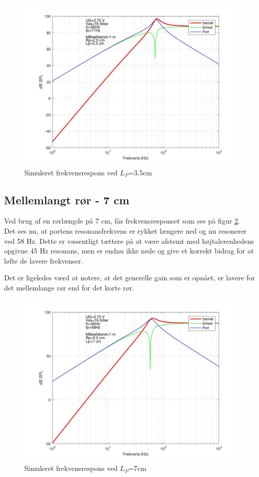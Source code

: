 \begin{figure}[h!]
	\centering
	\includegraphics[width=.8\textwidth]{Pics/sim_kort}
	\caption{Simuleret frekvensrespons ved $L_P$=3.5cm } 
	\label{fig:sim_kort}
\end{figure}

\subsection{Mellemlangt rør - 7 cm}

Ved brug af en rørlængde på 7 cm, fås frekvensresponset som ses på figur \ref{fig:sim_medium}. \\
Det ses nu, at portens resonansfrekvens er rykket længere ned og nu resonerer ved 58 Hz. Dette er væsentligt tættere på at være afstemt med højtalerenhedens opgivne 45 Hz resonans, men er endnu ikke nede og give et korrekt bidrag for at løfte de lavere frekvenser. 

Det er ligeledes værd at notere, at det generelle gain som er opnået, er lavere for det mellemlange rør end for det korte rør.  

\begin{figure}[h!]
	\centering
	\includegraphics[width=.8\textwidth]{Pics/sim_medium}
	\caption{Simuleret frekvensrespons ved $L_P$=7cm } 
	\label{fig:sim_medium}
\end{figure}

